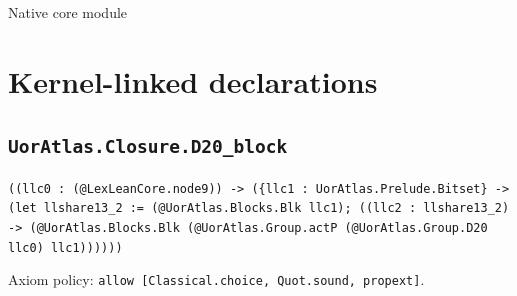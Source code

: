 \documentclass[11pt]{article}
\begin{document}
\begin{center}{\LARGE Native core module}\end{center}
\section*{Kernel-linked declarations}
\subsection*{\texttt{UorAtlas.Closure.D20\_block}}
\noindent\texttt{((llc0 : (@LexLeanCore.node9)) -> (\{llc1 : UorAtlas.Prelude.Bitset\} -> (let llshare13\_2 := (@UorAtlas.Blocks.Blk llc1); ((llc2 : llshare13\_2) -> (@UorAtlas.Blocks.Blk (@UorAtlas.Group.actP (@UorAtlas.Group.D20 llc0) llc1))))))}\par
\noindent Axiom policy: \texttt{allow [Classical.choice, Quot.sound, propext]}.\par
\end{document}
